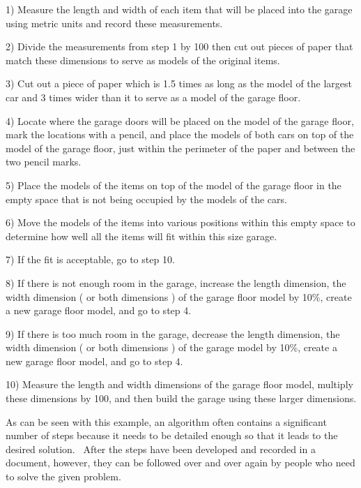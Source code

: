 \documentclass[12pt,twoside]{book}
\begin{document}
1) Measure the length and width of each item that will be placed into the garage using metric units and record these measurements. 


\bigskip

2) Divide the measurements from step 1 by 100 then cut out pieces of paper that match these dimensions to serve as models of the original items. 

\bigskip

3) Cut out a piece of paper which is 1.5 times as long as the model of the largest car and 3 times wider than it to serve as a model of the garage floor. 

\bigskip

4) Locate where the garage doors will be placed on the model of the garage floor, mark the locations with a pencil, and place the models of both cars on top of the model of the garage floor, just within the perimeter of the paper and between the two pencil marks. 

\bigskip

5) Place the models of the items on top of the model of the garage floor in the empty space that is not being occupied by the models of the cars. 

\bigskip

6) Move the models of the items into various positions within this empty space to determine how well all the items will fit within this size garage. 

\bigskip

7) If the fit is acceptable, go to step 10. 

\bigskip

8) If there is not enough room in the garage, increase the length dimension, the width dimension ( or both dimensions ) of the garage floor model by 10\%, create a new garage floor model, and go to step 4. 


9) If there is too much room in the garage, decrease the length dimension, the width dimension ( or both dimensions ) of the garage model by 10\%, create a new garage floor model, and go to step 4. 

\bigskip

10) Measure the length and width dimensions of the garage floor model, multiply these dimensions by 100, and then build the garage using these larger dimensions. 

\bigskip

As can be seen with this example, an algorithm often contains a significant number of steps because it needs to be detailed enough so that it leads to the desired solution. \ After the steps have been developed and recorded in a document, however, they can be followed over and over again by people who need to solve the given problem.
\end{document}
